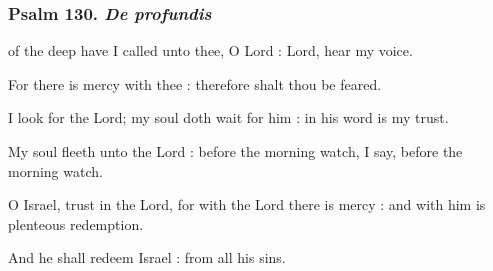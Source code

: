 \subsubsection{Psalm 130. \textit{De profundis}}
 of the deep have I called unto thee, O Lord : Lord, hear my voice.\par
{}
For there is mercy with thee : therefore shalt thou be feared.\par
{}I look for the Lord; my soul doth wait for him : in his word is my trust.\par
{}My soul fleeth unto the Lord : before the morning watch, I say, before the morning watch.\par
{}O Israel, trust in the Lord, for with the Lord there is mercy : and with him is plenteous redemption.\par
{}And he shall redeem Israel : from all his sins.\par

